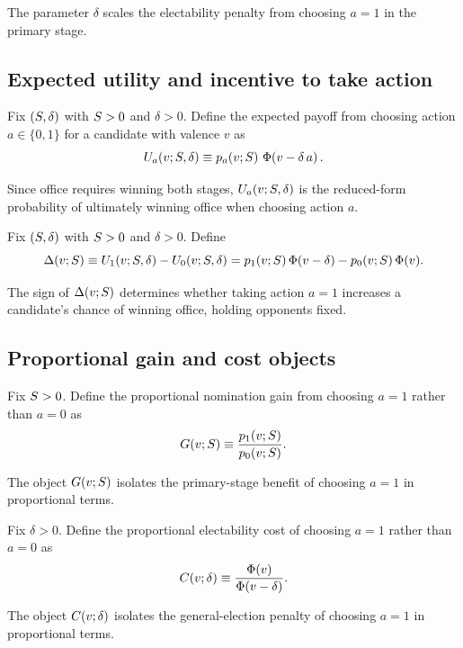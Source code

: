 \begin{remark*}
The parameter $\delta$ scales the electability penalty from choosing $a=1$ in the primary stage.
\end{remark*}

\subsection*{Expected utility and incentive to take action}
\begin{definition}\label{def:Urf}
Fix $(S,\delta)$ with $S>0$ and $\delta>0$. Define the expected payoff from choosing action $a\in\{0,1\}$ for a candidate with valence $v$ as
\[
    U_a(v;S,\delta) \equiv p_{a}\!\left(v;S\right)\, \Phi\!\left(v-\delta\,a\right).
\]
\end{definition}

\begin{remark*}
Since office requires winning both stages, $U_a(v;S,\delta)$ is the reduced-form probability of ultimately winning office when choosing action $a$.
\end{remark*}

\begin{definition}\label{def:Delta}
Fix $(S,\delta)$ with $S>0$ and $\delta>0$. Define
\[
    \Delta\!\left(v;S\right)
    \equiv
    U_1(v;S,\delta) - U_0(v;S,\delta)
    =
    p_{1}\!\left(v;S\right)\Phi(v-\delta) - p_{0}\!\left(v;S\right)\Phi(v).
\]
\end{definition}

\begin{remark*}
The sign of $\Delta\!\left(v;S\right)$ determines whether taking action $a=1$ increases a candidate's chance of winning office, holding opponents fixed.
\end{remark*}

\subsection*{Proportional gain and cost objects}
\begin{definition}\label{def:Gbasic}
Fix $S>0$. Define the proportional nomination gain from choosing $a=1$ rather than $a=0$ as
\[
    G\!\left(v;S\right) \equiv \frac{p_{1}\!\left(v;S\right)}{p_{0}\!\left(v;S\right)}.
\]
\end{definition}

\begin{remark*}
The object $G\!\left(v;S\right)$ isolates the primary-stage benefit of choosing $a=1$ in proportional terms.
\end{remark*}

\begin{definition}\label{def:Cbasic}
Fix $\delta>0$. Define the proportional electability cost of choosing $a=1$ rather than $a=0$ as
\[
    C\!\left(v;\delta\right) \equiv \frac{\Phi(v)}{\Phi(v-\delta)}.
\]
\end{definition}

\begin{remark*}
The object $C\!\left(v;\delta\right)$ isolates the general-election penalty of choosing $a=1$ in proportional terms.
\end{remark*}